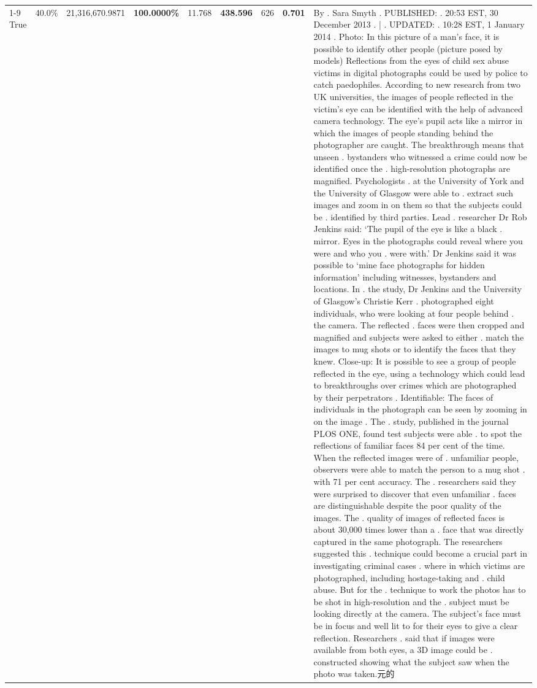 \begin{table}[H]
\begin{tabular}{lllrlllll}
\cline{1-9}
True & 40.0\% & 21,316,670.9871 & \bfseries \color{red} 100.0000\% & 11.768 & \bfseries \color{red} 438.596 & 626 & \bfseries \color{red} 0.701 & By . Sara Smyth . PUBLISHED: . 20:53 EST, 30 December 2013 . | . UPDATED: . 10:28 EST, 1 January 2014 . Photo: In this picture of a man's face, it is possible to identify other people (picture posed by models) Reflections from the eyes of child sex abuse victims in digital photographs could be used by police to catch paedophiles. According to new research from two UK universities, the images of people reflected in the victim's eye can be identified with the help of advanced camera technology. The eye's pupil acts like a mirror in which the images of people standing behind the photographer are caught. The breakthrough means that unseen . bystanders who witnessed a crime could now be identified once the . high-resolution photographs are magnified. Psychologists . at the University of York and the University of Glasgow were able to . extract such images and zoom in on them so that the subjects could be . identified by third parties. Lead . researcher Dr Rob Jenkins said: ‘The pupil of the eye is like a black . mirror. Eyes in the photographs could reveal where you were and who you . were with.' Dr Jenkins said it was possible to ‘mine face photographs for hidden information' including witnesses, bystanders and locations. In . the study, Dr Jenkins and the University of Glasgow's Christie Kerr . photographed eight individuals, who were looking at four people behind . the camera. The reflected . faces were then cropped and magnified and subjects were asked to either . match the images to mug shots or to identify the faces that they knew. Close-up: It is possible to see a group of people reflected in the eye, using a technology which could lead to breakthroughs over crimes which are photographed by their perpetrators . Identifiable: The faces of individuals in the photograph can be seen by zooming in on the image . The . study, published in the journal PLOS ONE, found test subjects were able . to spot the reflections of familiar faces 84 per cent of the time. When the reflected images were of . unfamiliar people, observers were able to match the person to a mug shot . with 71 per cent accuracy. The . researchers said they were surprised to discover that even unfamiliar . faces are distinguishable despite the poor quality of the images. The . quality of images of reflected faces is about 30,000 times lower than a . face that was directly captured in the same photograph. The researchers suggested this . technique could become a crucial part in investigating criminal cases . where in which victims are photographed, including hostage-taking and . child abuse. But for the . technique to work the photos has to be shot in high-resolution and the . subject must be looking directly at the camera. The subject's face must be in focus and well lit to for their eyes to give a clear reflection. Researchers . said that if images were available from both eyes, a 3D image could be . constructed showing what the subject saw when the photo was taken.元的 \\

\end{tabular}
\end{table}

